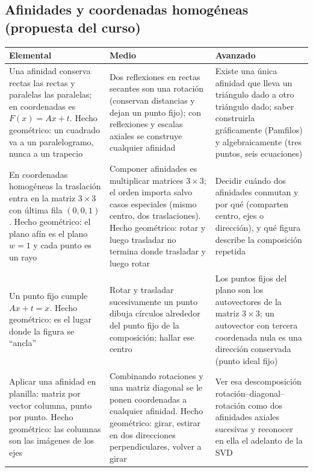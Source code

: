 \subsection{Afinidades y coordenadas homogéneas (propuesta del curso)}

{\small
\begin{tabularx}{\textwidth}{YYY}
\toprule
\textbf{Elemental} & \textbf{Medio} & \textbf{Avanzado}\\
\midrule
Una afinidad conserva rectas las rectas y paralelas las paralelas; en coordenadas es
\(F(x)=Ax+t\). Hecho geométrico: un cuadrado va a un paralelogramo, nunca a un trapecio &
Dos reflexiones en rectas secantes son una rotación (conservan distancias y dejan un punto
fijo); con reflexiones y escalas axiales se construye cualquier afinidad &
Existe una única afinidad que lleva un triángulo dado a otro triángulo dado; saber
construirla gráficamente (Pamfilos) y algebraicamente (tres puntos, seis ecuaciones)\\
\addlinespace
En coordenadas homogéneas la traslación entra en la matriz \(3\times3\) con última fila
\((0,0,1)\). Hecho geométrico: el plano afín es el plano \(w=1\) y cada punto es un rayo &
Componer afinidades es multiplicar matrices \(3\times3\); el orden importa salvo casos
especiales (mismo centro, dos traslaciones). Hecho geométrico: rotar y luego trasladar no
termina donde trasladar y luego rotar &
Decidir cuándo dos afinidades conmutan y por qué (comparten centro, ejes o dirección), y
qué figura describe la composición repetida\\
\addlinespace
Un punto fijo cumple \(Ax+t=x\). Hecho geométrico: es el lugar donde la figura se
``ancla'' &
Rotar y trasladar sucesivamente un punto dibuja círculos alrededor del punto fijo de la
composición; hallar ese centro &
Los puntos fijos del plano son los autovectores de la matriz \(3\times3\); un autovector
con tercera coordenada nula es una dirección conservada (punto ideal fijo)\\
\addlinespace
Aplicar una afinidad en planilla: matriz por vector columna, punto por punto. Hecho
geométrico: las columnas son las imágenes de los ejes &
Combinando rotaciones y una matriz diagonal se le ponen coordenadas a cualquier afinidad.
Hecho geométrico: girar, estirar en dos direcciones perpendiculares, volver a girar &
Ver esa descomposición rotación--diagonal--rotación como dos afinidades axiales sucesivas
y reconocer en ella el adelanto de la SVD\\
\bottomrule
\end{tabularx}
}

